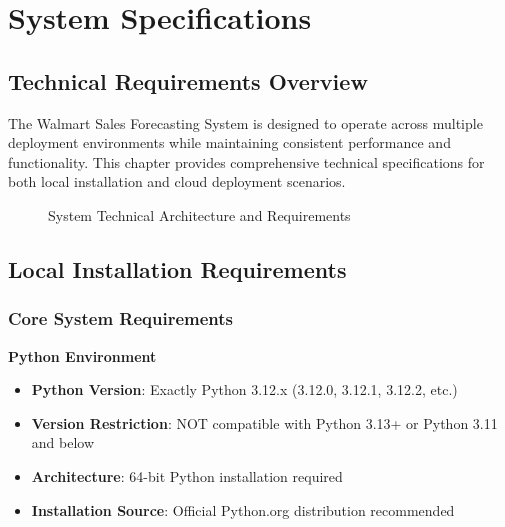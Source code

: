 %
%
%



\chapter{System Specifications}

\section{Technical Requirements Overview}

The Walmart Sales Forecasting System is designed to operate across multiple deployment environments while maintaining consistent performance and functionality. This chapter provides comprehensive technical specifications for both local installation and cloud deployment scenarios.

\begin{figure}[H]
	\centering
	
	\caption{System Technical Architecture and Requirements}
	\label{fig:technical_architecture}
\end{figure}

\section{Local Installation Requirements}

\subsection{Core System Requirements}

\textbf{Python Environment}
\begin{itemize}
	\item \textbf{Python Version}: Exactly Python 3.12.x (3.12.0, 3.12.1, 3.12.2, etc.)
	\item \textbf{Version Restriction}: NOT compatible with Python 3.13+ or Python 3.11 and below
	\item \textbf{Architecture}: 64-bit Python installation required
	\item \textbf{Installation Source}: Official Python.org distribution recommended
\end{itemize}

